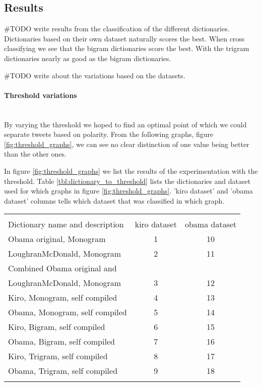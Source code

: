 \subsection{Results}
#TODO write results from the classification of the different dictionaries. \\
Dictionaries based on their own dataset naturally scores the best. When cross
classifying we see that the bigram dictionaries score the best. With the
trigram dictionaries nearly as good as the bigram dictionaries.

#TODO write about the variations based on the datasets. \\

\paragraph{Threshold variations}
\hspace{0pt}\\
By varying the threshold we hoped to find an optimal point of which we could
separate tweets based on polarity. From the following
graphs, figure \ref{fig:threshold_graphs}, we can see no clear distinction of
one value being better than the other ones.  

In figure \ref{fig:threshold_graphs} we list the results of the experimentation
with the threshold. Table \ref{tbl:dictionary_to_threshold} lists the
dictionaries and dataset used for which graphs in figure \ref{fig:threshold_graphs}.
'kiro dataset' and 'obama dataset' columns tells which dataset that was
classified in which graph.

\begin{tabular}{ l c c }
\hspace{0pt}\\
Dictionary name and description & kiro dataset & obama dataset \\ 
Obama original, Monogram & 1 & 10 \\
LoughranMcDonald, Monogram & 2 & 11 \\
Combined Obama original and \\ LoughranMcDonald, Monogram & 3 & 12 \\
Kiro, Monogram, self compiled & 4 & 13 \\
Obama, Monogram, self compiled & 5 & 14 \\
Kiro, Bigram, self compiled & 6 & 15 \\
Obama, Bigram, self compiled & 7 & 16 \\
Kiro, Trigram, self compiled & 8 & 17 \\
Obama, Trigram, self compiled & 9 & 18 \\

\label{tbl:dictionary_to_threshold}
\end{tabular}

